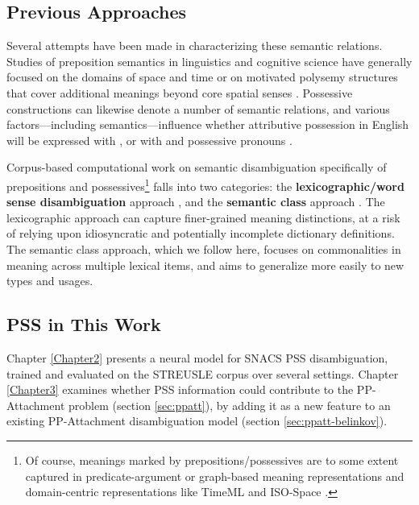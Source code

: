 \subsection{Previous Approaches}

Several attempts have been made in characterizing these semantic relations. Studies of preposition semantics in linguistics and cognitive science have generally focused on the domains of space and time \citep[e.g.,][]{herskovits-86,bowerman-01,regier-96,khetarpal-09,xu-10,zwarts-00} or on motivated polysemy structures that cover additional meanings beyond core spatial senses \citep{brugman-81,lakoff-87,tyler-03,lindstromberg-10}.
Possessive constructions can likewise denote a number of semantic relations, and various factors---including semantics---influence whether attributive possession in English will be expressed with , or with  and possessive pronouns \citep[the `genitive alternation';][]{taylor-96,nikiforidou-91,rosenbach-02,heine-06,wolk-13,shih-15}.

Corpus-based computational work on semantic disambiguation specifically of prepositions and possessives\footnote{Of course, meanings marked by prepositions\slash possessives are to some extent captured in predicate-argument or graph-based meaning representations \citep[e.g.,][]{palmer-05,framenet,oepen-16,amr} and domain-centric representations like TimeML and \mbox{ISO-Space} \citep{timeml,isospace}.} %
falls into two categories: 
the \textbf{lexicographic\slash word sense disambiguation} approach \citep{litkowski-05,litkowski-07,litkowski-14,ye-07,prepnet,dahlmeier-09,tratz-09,hovy-10,hovy-11,tratz-13},
and the \textbf{semantic class} approach \citep[see also \citealp{muller-12} for German]{moldovan-04,badulescu-09,ohara-09,srikumar-11,srikumar-13,schneider-15,schneider-16,hwang-17}.
The lexicographic approach can capture finer-grained meaning distinctions, at a risk of relying upon idiosyncratic and potentially incomplete dictionary definitions. 
The semantic class approach, which we follow here, focuses on commonalities in meaning across multiple lexical items, and aims to generalize more easily to new types and usages.


\subsection{PSS in This Work}

Chapter \ref{Chapter2} presents a neural model for SNACS PSS disambiguation, trained and evaluated on the STREUSLE corpus over several settings. Chapter \ref{Chapter3} examines whether PSS information could contribute to the PP-Attachment problem (section \ref{sec:ppatt}), by adding it as a new feature to an existing PP-Attachment disambiguation model (section \ref{sec:ppatt-belinkov}).


